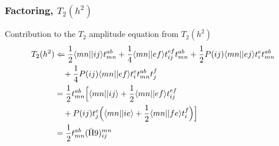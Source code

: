 \begin{frame}
    \frametitle{Factoring, $T_2(h^2)$}

\begin{block}{Contribution to the $\hat{T}_2$ amplitude equation from $T_2(h^2)$}
\begin{align*}
    T_2(h^2) & \Leftarrow
        \frac{1}{2} \langle mn||ij\rangle t_{mn}^{ab}
        + \frac{1}{4} \langle mn||ef\rangle t_{ij}^{ef} t_{mn}^{ab}
        + \frac{1}{2} P(ij) \langle mn||ej\rangle t_i^e t_{mn}^{ab} \notag \\
        & \quad + \frac{1}{4} P(ij) \langle mn||ef\rangle t_i^e t_{mn}^{ab} t_j^f \notag \\
    &= \frac{1}{2} t_{mn}^{ab} \Bigl[
        \langle mn||ij\rangle
        + \frac{1}{2} \langle mn||ef\rangle t_{ij}^{ef} \notag \\
        & \quad + P(ij) t_j^e \Bigl(
            \langle mn||ie\rangle + \frac{1}{2} \langle mn||fe\rangle t_i^f
        \Bigr)
    \Bigr] \notag \\
    &= \frac{1}{2} t_{mn}^{ab} (\mathrm{\bar{H}9})_{ij}^{mn}
\end{align*}

\end{block}
\end{frame}

